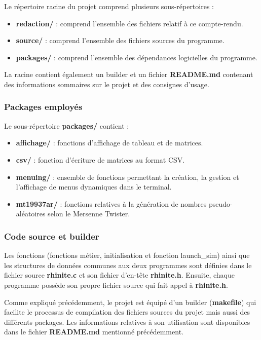 \documentclass[12pt,french,titlepage]{article}
\begin{document}
Le répertoire racine du projet comprend plusieurs sous-répertoires :
\begin{itemize}
\item \textbf{redaction/} : comprend l'ensemble des fichiers relatif à ce compte-rendu.
\item \textbf{source/} : comprend l'ensemble des fichiers sources du programme.
\item \textbf{packages/} : comprend l'ensemble des dépendances logicielles du programme.
\end{itemize}

La racine contient également un builder et un fichier \textbf{README.md} contenant des informations sommaires sur le projet et des consignes d'usage.

\newpage
 
\subsubsection{Packages employés}
Le sous-répertoire \textbf{packages/} contient :
\begin{itemize}
\item \textbf{affichage/} : fonctions d'affichage de tableau et de matrices.
\item \textbf{csv/} : fonction d'écriture de matrices au format CSV.
\item \textbf{menuing/} : ensemble de fonctions permettant la création, la gestion et l'affichage de menus dynamiques dans le terminal.
\item \textbf{mt19937ar/} : fonctions relatives à la génération de nombres pseudo-aléatoires selon le Mersenne Twister. 
\end{itemize}

\subsubsection{Code source et builder}
Les fonctions (fonctions métier, initialisation et fonction launch\_sim) ainsi que les structures de données communes aux deux programmes sont définies dans le fichier source \textbf{rhinite.c} et son fichier d'en-tête \textbf{rhinite.h}. Ensuite, chaque programme possède son propre fichier source qui fait appel à \textbf{rhinite.h}.

Comme expliqué précédemment, le projet est équipé d'un builder (\textbf{makefile}) qui facilite le processus de compilation des fichiers sources du projet mais aussi des différents packages. Les informations relatives à son utilisation sont disponibles dans le fichier \textbf{README.md} mentionné précédemment.
\end{document}
